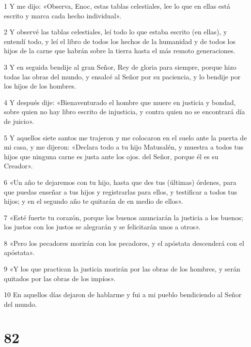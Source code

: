 \par 1 Y me dijo: «Observa, Enoc, estas tablas celestiales, lee lo que en ellas está escrito y marca cada hecho individual».
\par 2 Y observé las tablas celestiales, leí todo lo que estaba escrito (en ellas), y entendí todo, y leí el libro de todos los hechos de la humanidad y de todos los hijos de la carne que habrán sobre la tierra hasta el más remoto generaciones.
\par 3 Y en seguida bendije al gran Señor, Rey de gloria para siempre, porque hizo todas las obras del mundo, y ensalcé al Señor por su paciencia, y lo bendije por los hijos de los hombres.
\par 4 Y después dije: «Bienaventurado el hombre que muere en justicia y bondad, sobre quien no hay libro escrito de injusticia, y contra quien no se encontrará día de juicio».
\par 5 Y aquellos siete santos me trajeron y me colocaron en el suelo ante la puerta de mi casa, y me dijeron: «Declara todo a tu hijo Matusalén, y muestra a todos tus hijos que ninguna carne es justa ante los ojos. del Señor, porque él es su Creador».
\par 6 «Un año te dejaremos con tu hijo, hasta que des tus (últimas) órdenes, para que puedas enseñar a tus hijos y registrarlas para ellos, y testificar a todos tus hijos; y en el segundo año te quitarán de en medio de ellos».
\par 7 «Esté fuerte tu corazón, porque los buenos anunciarán la justicia a los buenos; los justos con los justos se alegrarán y se felicitarán unos a otros».
\par 8 «Pero los pecadores morirán con los pecadores, y el apóstata descenderá con el apóstata».
\par 9 «Y los que practican la justicia morirán por las obras de los hombres, y serán quitados por las obras de los impíos».
\par 10 En aquellos días dejaron de hablarme y fui a mi pueblo bendiciendo al Señor del mundo.

\chapter{82}

